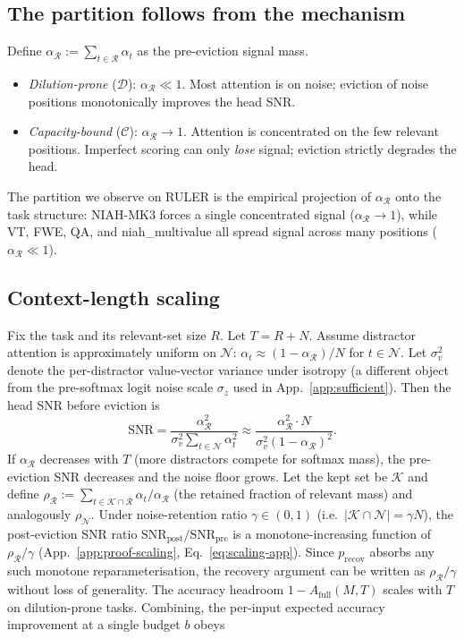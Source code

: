 \documentclass{article} %
\begin{document}
\subsection{The partition follows from the mechanism}

Define $\alpha_{\mathcal{R}} := \sum_{t \in \mathcal{R}} \alpha_t$ as the
pre-eviction signal mass.
\begin{itemize}
  \item \emph{Dilution-prone} ($\mathcal{D}$): $\alpha_{\mathcal{R}} \ll 1$.
  Most attention is on noise; eviction of noise positions monotonically
  improves the head SNR.
  \item \emph{Capacity-bound} ($\mathcal{C}$): $\alpha_{\mathcal{R}} \to 1$.
  Attention is concentrated on the few relevant positions. Imperfect
  scoring can only \emph{lose} signal; eviction strictly degrades the
  head.
\end{itemize}
The partition we observe on RULER is the empirical projection of
$\alpha_{\mathcal{R}}$ onto the task structure: NIAH-MK3 forces a
single concentrated signal ($\alpha_{\mathcal{R}} \to 1$), while VT, FWE,
QA, and niah\_multivalue all spread signal across many positions
($\alpha_{\mathcal{R}} \ll 1$).

\subsection{Context-length scaling}

Fix the task and its relevant-set size $R$. Let $T = R + N$. Assume
distractor attention is approximately uniform on $\mathcal{N}$:
$\alpha_t \approx (1 - \alpha_{\mathcal{R}}) / N$ for $t \in \mathcal{N}$.
Let $\sigma_v^2$ denote the per-distractor value-vector variance under
isotropy (a different object from the pre-softmax logit noise scale
$\sigma_z$ used in App.~\ref{app:sufficient}). Then the head SNR before
eviction is
\[
\mathrm{SNR} = \frac{\alpha_{\mathcal{R}}^2}{\sigma_v^2 \sum_{t \in \mathcal{N}}
\alpha_t^2} \approx \frac{\alpha_{\mathcal{R}}^2 \cdot N}{\sigma_v^2 (1 -
\alpha_{\mathcal{R}})^2}.
\]
If $\alpha_{\mathcal{R}}$ decreases with $T$ (more distractors compete for
softmax mass), the pre-eviction SNR decreases and the noise floor grows.
Let the kept set be $\mathcal{K}$ and define $\rho_{\mathcal{R}} :=
\sum_{t \in \mathcal{K} \cap \mathcal{R}} \alpha_t / \alpha_{\mathcal{R}}$
(the retained fraction of relevant mass) and analogously $\rho_{\mathcal{N}}$.
Under noise-retention ratio $\gamma \in (0, 1)$ (i.e.\ $|\mathcal{K} \cap
\mathcal{N}| = \gamma N$), the post-eviction SNR ratio
$\mathrm{SNR}_{\mathrm{post}} / \mathrm{SNR}_{\mathrm{pre}}$ is a
monotone-increasing function of $\rho_{\mathcal{R}} / \gamma$
(App.~\ref{app:proof-scaling}, Eq.~\eqref{eq:scaling-app}). Since
$p_{\mathrm{recov}}$ absorbs any such monotone reparameterisation, the
recovery argument can be written as $\rho_{\mathcal{R}} / \gamma$ without
loss of generality. The accuracy headroom $1 - A_{\mathrm{full}}(M, T)$
scales with $T$ on dilution-prone tasks. Combining, the per-input expected
accuracy improvement at a single budget $b$ obeys
\end{document}
